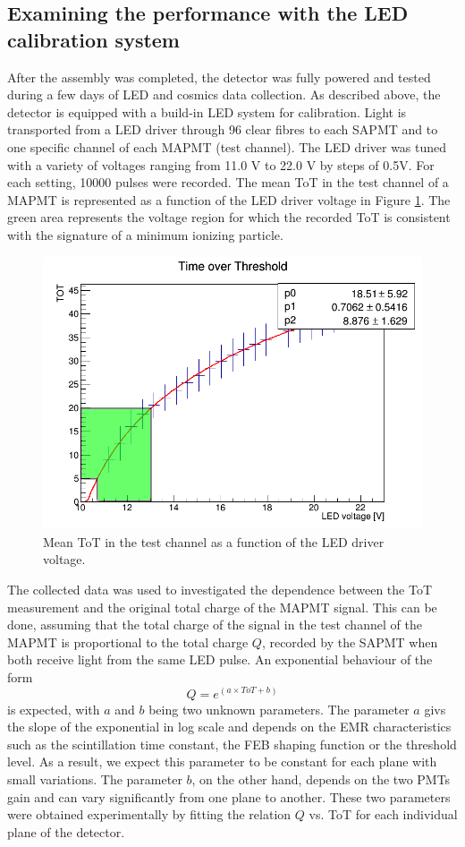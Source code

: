 \documentclass[a4paper,11pt]{article}
\begin{document}
\subsection{Examining the performance with the LED calibration system}\label{sec:cosmic_perf}
After the assembly was completed, the detector was fully powered and tested during a few days of LED and cosmics data collection. As described above,
the detector is equipped with a build-in LED system for calibration.  Light is transported from a LED driver through 96 clear fibres to each SAPMT and to
one specific channel of each MAPMT (test channel). The LED driver was tuned with a variety of voltages ranging from 11.0 V to 22.0 V by steps of 0.5V. For
each setting, 10000 pulses were recorded. The mean ToT in the test channel of a MAPMT is represented as a function of the LED driver voltage in Figure
\ref{fig:voltage}. The green area represents the voltage region for which the recorded ToT is consistent with the signature of a minimum ionizing particle.

\begin{figure}[htr!]
   \centering
   \includegraphics[width=.49\textwidth]{settings.png}
   \caption{Mean ToT in the test channel as a function of the LED driver voltage.}
   \label{fig:voltage}
\end{figure}

The collected data was used to investigated the dependence between the ToT measurement and the original total charge of the MAPMT signal. This can be done,
assuming that the total charge of the signal in the test channel of the MAPMT is proportional to the total charge $Q$, recorded by the SAPMT when both receive
light from the same LED pulse. An exponential behaviour of the form
\begin{equation}
 Q=e^{(a\times ToT+b)}
 \label{exp}
\end{equation}
is expected, with $a$ and $b$ being two unknown parameters. The parameter $a$ givs the slope of the exponential in log scale and depends on the EMR 
characteristics such as the scintillation time constant, the FEB shaping function or the threshold level. As a result, we expect this parameter to be
constant for each plane with small variations. The parameter $b$, on the other hand, depends on the two PMTs gain and can vary significantly from one
plane to another. These two parameters were obtained experimentally by fitting the relation $Q$ vs. ToT for each individual plane of the detector.
\end{document}
